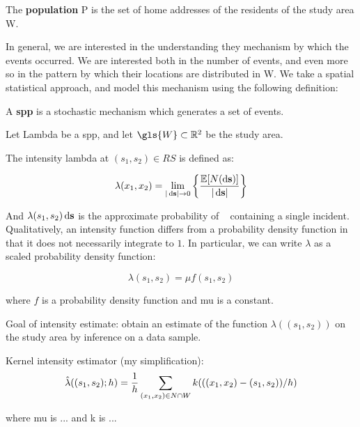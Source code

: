 \begin{defn}
    The \textbf{population} \gls{P} is the set of home addresses of the residents of the study area \gls{W}.
\end{defn}

In general, we are interested in the understanding they mechanism by which the events occurred.
We are interested both in the number of events, and even more so in the pattern by which their locations are distributed in \gls{W}.
We take a spatial statistical approach, and model this mechanism using the following definition:

\begin{defn}
    A \textbf{\gls{spp}} is a stochastic mechanism which generates a set of events.
\end{defn}

Let \gls{Lambda} be a \gls{spp}, and let $\gls{W} \subset \RS $ be the study area.

The intensity \gls{lambda} at $(s_1, s_2) \in RS$ is defined as:

\begin{equation}
\label{eq:lambda_differential}
    \lambda \xvec = \lim_{|\ds| \to 0}
        \left\{
            \frac{\mathbb{E}[N(\ds)]}%
            {|\ds|}
        \right\}
\end{equation}

And $\lambda(s_1, s_2) \mathop{}\!\mathrm{d}{\mathbf{s}}$ is the approximate probability of \ds~ containing a single incident.
Qualitatively, an intensity function differs from a probability density function in that it does not necessarily integrate to $1$.
In particular, we can write $\lambda$ as a scaled probability density function:

\begin{equation}
\label{eq:lambda_mu}
    \lambda(s_1, s_2) = \mu f\!(s_1, s_2)
\end{equation}

where $f$ is a probability density function and \gls{mu} is a constant.

Goal of intensity estimate: obtain an estimate of the function $\lambda((s_1, s_2))$ on the study area by inference on a data sample.

Kernel intensity estimator (my simplification):
\begin{equation}
\label{eq:lambda_hat}
    \hat{\lambda}((s_1, s_2); h) 
        = \frac{1}{h} \sum_{(x_1, x_2) \in N \cap W}
            {k(((x_1, x_2)-(s_1, s_2))/h)}
\end{equation}

where \gls{mu} is ... and \gls{k} is ...

